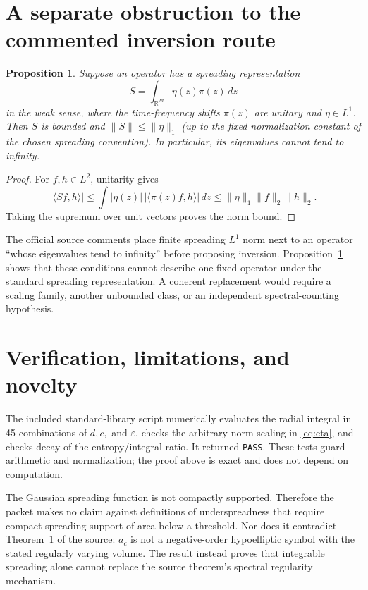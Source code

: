 \documentclass[11pt]{article}
\newtheorem{proposition}{Proposition}
\newcommand{\R}{\mathbb R}
\newcommand{\eps}{\varepsilon}
\newcommand{\ip}[2]{\langle #1,#2\rangle}
\begin{document}
\section{A separate obstruction to the commented inversion route}

\begin{proposition}\label{prop:bounded}
Suppose an operator has a spreading representation
\[
S=\int_{\R^{2d}}\eta(z)\pi(z)\,dz
\]
in the weak sense, where the time-frequency shifts $\pi(z)$ are unitary and
$\eta\in L^1$.  Then $S$ is bounded and
$\|S\|\le\|\eta\|_1$ (up to the fixed normalization constant of the chosen
spreading convention).  In particular, its eigenvalues cannot tend to
infinity.
\end{proposition}

\begin{proof}
For $f,h\in L^2$, unitarity gives
\[
|\ip{Sf}{h}|
\le\int |\eta(z)|\,|\ip{\pi(z)f}{h}|\,dz
\le\|\eta\|_1\|f\|_2\|h\|_2.
\]
Taking the supremum over unit vectors proves the norm bound.
\end{proof}

The official source comments place finite spreading $L^1$ norm next to an
operator ``whose eigenvalues tend to infinity'' before proposing inversion.
Proposition~\ref{prop:bounded} shows that these conditions cannot describe one
fixed operator under the standard spreading representation.  A coherent
replacement would require a scaling family, another unbounded class, or an
independent spectral-counting hypothesis.

\section{Verification, limitations, and novelty}

The included standard-library script numerically evaluates the radial
integral in 45 combinations of $d,c,$ and $\eps$, checks the arbitrary-norm
scaling in \eqref{eq:eta}, and checks decay of the entropy/integral ratio.  It
returned \texttt{PASS}.  These tests guard arithmetic and normalization; the
proof above is exact and does not depend on computation.

The Gaussian spreading function is not compactly supported.  Therefore the
packet makes no claim against definitions of underspreadness that require
compact spreading support of area below a threshold.  Nor does it contradict
Theorem~1 of the source: $a_c$ is not a negative-order hypoelliptic symbol with
the stated regularly varying volume.  The result instead proves that
integrable spreading alone cannot replace the source theorem's spectral
regularity mechanism.
\end{document}

